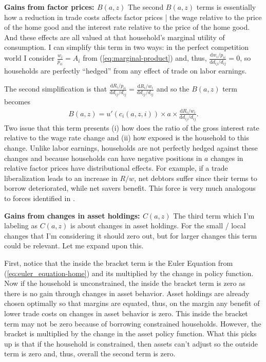 \documentclass[12pt,pdftex]{article}
\begin{document}
\begin{onehalfspacing}
\textbf{Gains from factor prices: $B(a,z)$} The second $B(a,z)$ terms is essentially how a reduction in trade costs affects factor prices | the wage relative to the price of the home good and the interest rate relative to the price of the home good. And these effects are all valued at that household's marginal utility of consumption. I can simplify this term in two ways: in the perfect competition world I consider $\frac{w_i}{p_{ii}} = A_{i}$ from (\ref{eq:marginal-product}) and, thus, $\frac{\mathrm{d} w_{i} / p_{ii}}{\mathrm{d} d_{ij} / d_{ij}} = 0$, so households are perfectly ``hedged'' from any effect of trade on labor earnings.

The second simplification is that $\frac{\mathrm{d} R_{i} / p_{ii}}{\mathrm{d} d_{ij} / d_{ij}} = \frac{\mathrm{d} R_{i} / w_{i}}{\mathrm{d} d_{ij} / d_{ij}}$ and so the $B(a,z)$ term becomes
\begin{align}
B(a,z) = u'(c_{i}(a,z,i)) \times  a \times \frac{\mathrm{d} R_{i} / w_{i}}{\mathrm{d} d_{ij} / d_{ij}}.
\end{align}
Two issue that this term presents (i) how does the ratio of the gross interest rate relative to the wage rate change and (ii) how exposed is the household to this change. Unlike labor earnings, households are not perfectly hedged against these changes and because households can have negative positions in $a$ changes in relative factor prices have distributional effects.  For example, if a trade liberalization leads to an increase in $R / w$, net debtors suffer since their terms to borrow deteriorated, while net savers benefit. This force is very much analogous to forces identified in \citet{auclert2019monetary}.

\textbf{Gains from changes in asset holdings: $C(a,z)$} The third term which I'm labeling as $C(a,z)$ is about changes in asset holdings. For the small / local changes that I'm considering it should zero out, but for larger changes this term could be relevant. Let me expand upon this.

First, notice that the inside the bracket term is the Euler Equation from (\ref{eq:euler_equation-home}) and its multiplied by the change in policy function. Now if the household is unconstrained, the inside the bracket term is zero as there is no gain through changes in asset behavior. Asset holdings are already chosen optimally so that margins are equated, thus, on the margin any benefit of lower trade costs on changes in asset behavior is zero. This inside the bracket term may not be zero because of borrowing constrained households. However, the bracket is multiplied by the change in the asset policy function. What this picks up is that if the household is constrained, then assets can't adjust so the outside term is zero and, thus, overall the second term is zero.


\end{onehalfspacing}
\end{document}
